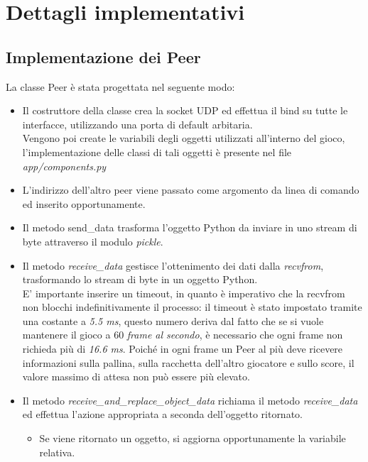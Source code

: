 
\thispagestyle{headings}
\newpage
\section{Dettagli implementativi}\label{sec:implementazione}

\subsection{Implementazione dei Peer}\label{subsec:implementazione-dei-peer}

La classe Peer è stata progettata nel seguente modo:
\begin{itemize}
    \item Il costruttore della classe crea la socket UDP ed effettua il bind su tutte le interfacce, utilizzando
    una porta di default arbitaria. \\
    Vengono poi create le variabili degli oggetti utilizzati all'interno del gioco, l'implementazione
    delle classi di tali oggetti è presente nel file
    \textit{app/components.py}
    \item L'indirizzo dell'altro peer viene passato come argomento da linea di comando ed inserito opportunamente.
    \item Il metodo send\_data trasforma l'oggetto Python da inviare in uno stream di byte attraverso il modulo
    \textit{pickle}.
    \item Il metodo \textit{receive\_data} gestisce l'ottenimento dei dati dalla \textit{recvfrom}, trasformando lo
    stream di byte in un oggetto Python. \\
    E' importante inserire un timeout, in quanto è imperativo che la recvfrom non blocchi indefinitivamente il processo:
    il timeout è stato impostato tramite una costante a \textit{5.5 ms}, questo numero deriva dal fatto che se si vuole
    mantenere il gioco a 60 \textit{frame al secondo}, è necessario che ogni frame non richieda più di \textit{16.6 ms}.
    Poiché in ogni frame un Peer al più deve ricevere informazioni sulla pallina, sulla racchetta dell'altro giocatore
    e sullo score, il valore massimo di attesa non può essere più elevato.
    \item Il metodo \textit{receive\_and\_replace\_object\_data} richiama il metodo \textit{receive\_data} ed effettua
    l'azione appropriata a seconda dell'oggetto ritornato.
        \begin{itemize}
            \item Se viene ritornato un oggetto, si aggiorna opportunamente la variabile relativa.

\end{itemize}
\end{itemize}
